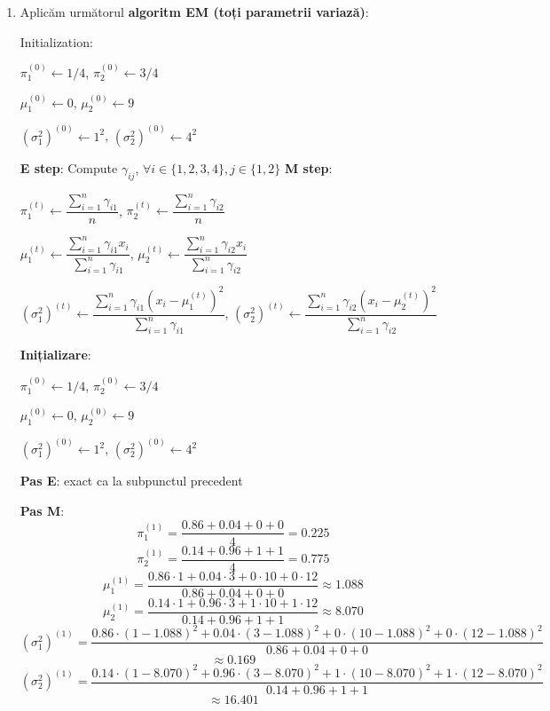 \documentclass[12pt]{article}
\begin{document}
\begin{enumerate}
\begin{enumerate}
			\item Aplicăm următorul \textbf{algoritm EM (toți parametrii variază)}:
			\begin{algorithmic}
				\STATE Initialization: 
				
				$\pi_1^{(0)}\gets 1/4$, $\pi_2^{(0)}\gets 3/4$
				
				$\mu_1^{(0)}\gets 0$, $\mu_2^{(0)}\gets 9$
				
				$(\sigma_1^2)^{(0)}\gets 1^2$, $(\sigma_2^2)^{(0)}\gets 4^2$
				
				\STATE \textbf{E step}: Compute $\gamma_{ij}$, $\forall i \in \{1,2,3,4\}, j\in \{1,2\}$
				\STATE \textbf{M step}: 
				
				$\pi_1^{(t)} \gets \dfrac{\sum_{i=1}^{n} \gamma_{i1}}{n}$, $\pi_2^{(t)} \gets \dfrac{\sum_{i=1}^{n} \gamma_{i2}}{n}$
				
				$\mu_1^{(t)} \gets \dfrac{\sum_{i=1}^{n} \gamma_{i1} x_i}{\sum_{i=1}^{n} \gamma_{i1}}$, $\mu_2^{(t)} \gets \dfrac{\sum_{i=1}^{n} \gamma_{i2} x_i}{\sum_{i=1}^{n} \gamma_{i2}}$
				
				$(\sigma_1^2)^{(t)} \gets \dfrac{\sum_{i=1}^{n} \gamma_{i1} (x_i - \mu_1^{(t)})^2}{\sum_{i=1}^{n} \gamma_{i1}}$, $(\sigma_2^2)^{(t)} \gets \dfrac{\sum_{i=1}^{n} \gamma_{i2} (x_i - \mu_2^{(t)})^2}{\sum_{i=1}^{n} \gamma_{i2}}$
				\ENDFOR
			\end{algorithmic}
		
			\textbf{Inițializare}:
		
			$\pi_1^{(0)}\gets 1/4$, $\pi_2^{(0)}\gets 3/4$
			
			$\mu_1^{(0)}\gets 0$, $\mu_2^{(0)}\gets 9$
			
			$(\sigma_1^2)^{(0)}\gets 1^2$, $(\sigma_2^2)^{(0)}\gets 4^2$
			
			\textbf{Pas E}: exact ca la subpunctul precedent
			
			\textbf{Pas M}: 
			$$\pi_1^{(1)} = \dfrac{0.86 + 0.04 + 0+ 0}{4} = 0.225$$
			$$\pi_2^{(1)} = \dfrac{0.14 + 0.96 + 1+ 1}{4} = 0.775$$
			$$\mu_1^{(1)} = \frac{0.86 \cdot 1 + 0.04 \cdot 3 + 0 \cdot 10 + 0 \cdot 12}{0.86 + 0.04 + 0 + 0} \approx 1.088$$
			$$\mu_2^{(1)} = \frac{0.14 \cdot 1 + 0.96 \cdot 3 +1 \cdot 10 + 1 \cdot 12}{0.14 + 0.96 + 1 + 1} \approx 8.070$$
			$$(\sigma^2_1)^{(1)} = \frac{0.86 \cdot (1 - 1.088)^2 + 0.04 \cdot (3-1.088)^2 + 0 \cdot (10 - 1.088)^2 + 0 \cdot (12 - 1.088)^2}{0.86 + 0.04 + 0 + 0}$$
			$$\approx 0.169$$
			$$(\sigma^2_2)^{(1)} = \frac{0.14 \cdot (1 - 8.070)^2 + 0.96 \cdot (3-8.070)^2 + 1 \cdot (10 - 8.070)^2 + 1 \cdot (12 - 8.070)^2}{0.14 + 0.96 + 1 + 1}$$
			$$\approx 16.401$$
			

\end{enumerate}
\end{enumerate}
\end{document}
